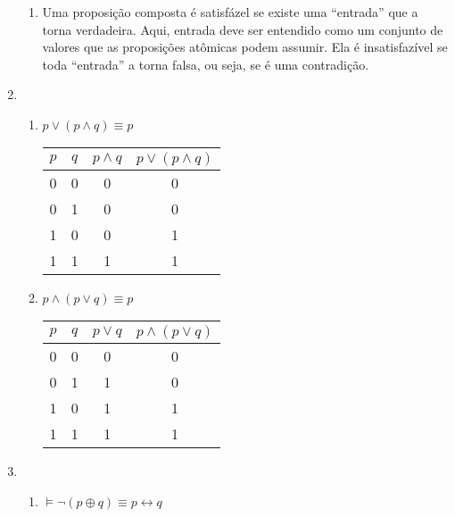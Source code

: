 \documentclass[12pt]{article}
\let\biconditional\leftrightarrow
\begin{document}
\begin{enumerate}
\begin{enumerate}
            \item Uma proposição composta é satisfázel se existe uma ``entrada'' que a torna verdadeira. Aqui, entrada deve ser entendido como um conjunto de valores que as proposições atômicas podem assumir. Ela é insatisfazível se toda ``entrada'' a torna falsa, ou seja, se é uma contradição.
        \end{enumerate}
    \item 
        \begin{enumerate}
            \item \( p \lor (p \land q) \equiv p\) 
                \begin{center}
                    \begin{tabular}{||c c || c c||} 
                        \hline
                        \( p \)  & \( q \) & \( p \land q  \) & \( p \lor  (p \land q) \) \\ [0.5ex]
                        \hline\hline
                        0 & 0 & 0 & 0 \\ 
                        \hline
                        0 & 1 & 0 & 0 \\
                        \hline
                        1 & 0 & 0 & 1 \\
                        \hline
                        1 & 1 & 1 & 1 \\ [1ex]
                        \hline
                    \end{tabular}
                \end{center}
            \item \( p \land (p \lor q) \equiv p\) 
                \begin{center}
                    \begin{tabular}{||c c || c c||} 
                        \hline
                        \( p \)  & \( q \) & \( p \lor q  \) & \( p \land  (p \lor q) \) \\ [0.5ex]
                        \hline\hline
                        0 & 0 & 0 & 0 \\ 
                        \hline
                        0 & 1 & 1 & 0 \\
                        \hline
                        1 & 0 & 1 & 1 \\
                        \hline
                        1 & 1 & 1 & 1 \\ [1ex]
                        \hline
                    \end{tabular}
                \end{center}
        \end{enumerate}
    \item 
        \begin{enumerate}
            \item \(\models \neg (p \oplus q) \equiv p \biconditional q \) 


\end{enumerate}
\end{enumerate}
\end{document}
